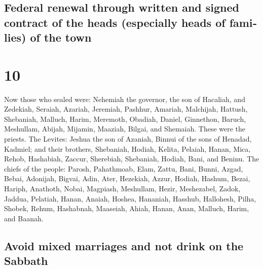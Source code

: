 \begin{paracol}{2}
\switchcolumn
\begin{otherlanguage}{english}

\hypertarget{federal-renewal-through-written-and-signed-contract-of-the-heads-especially-heads-of-families-of-the-town}{%
\subsection{Federal renewal through written and signed contract of the
heads (especially heads of families) of the
town}\label{federal-renewal-through-written-and-signed-contract-of-the-heads-especially-heads-of-families-of-the-town}}

\hypertarget{section-19}{%
\section{10}\label{section-19}}

 Now those who sealed were: Nehemiah the governor, the son
of Hacaliah, and Zedekiah,  Seraiah, Azariah, Jeremiah,
 Pashhur, Amariah, Malchijah,  Hattush,
Shebaniah, Malluch,  Harim, Meremoth, Obadiah,
 Daniel, Ginnethon, Baruch,  Meshullam,
Abijah, Mijamin,  Maaziah, Bilgai, and Shemaiah. These
were the priests.  The Levites: Jeshua the son of Azaniah,
Binnui of the sons of Henadad, Kadmiel;  and their
brothers, Shebaniah, Hodiah, Kelita, Pelaiah, Hanan, 
Mica, Rehob, Hashabiah,  Zaccur, Sherebiah, Shebaniah,
 Hodiah, Bani, and Beninu.  The chiefs of
the people: Parosh, Pahathmoab, Elam, Zattu, Bani, 
Bunni, Azgad, Bebai,  Adonijah, Bigvai, Adin,
 Ater, Hezekiah, Azzur,  Hodiah, Hashum,
Bezai,  Hariph, Anathoth, Nobai, 
Magpiash, Meshullam, Hezir,  Meshezabel, Zadok, Jaddua,
 Pelatiah, Hanan, Anaiah,  Hoshea,
Hananiah, Hasshub,  Hallohesh, Pilha, Shobek,
 Rehum, Hashabnah, Maaseiah,  Ahiah,
Hanan, Anan,  Malluch, Harim, and Baanah.

\hypertarget{avoid-mixed-marriages-and-not-drink-on-the-sabbath}{%
\subsection{Avoid mixed marriages and not drink on the
Sabbath}\label{avoid-mixed-marriages-and-not-drink-on-the-sabbath}}


\end{otherlanguage}
\end{paracol}
